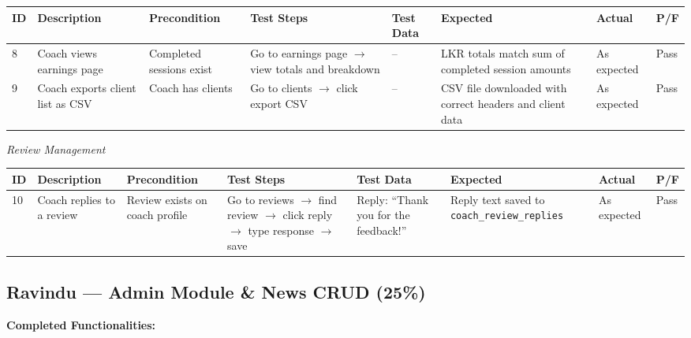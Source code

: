 \documentclass[12pt,a4paper]{report}
\begin{document}
\begin{center}
\footnotesize
\begin{longtable}{p{0.4cm} p{2.2cm} p{1.8cm} p{3.2cm} p{2.2cm} p{2.2cm} p{1.4cm} p{0.8cm}}
\toprule
\textbf{ID} & \textbf{Description} & \textbf{Precondition} & \textbf{Test Steps} & \textbf{Test Data} & \textbf{Expected} & \textbf{Actual} & \textbf{P/F}\\
\midrule
\endhead
8 & Coach views earnings page & Completed sessions exist & Go to earnings page $\to$ view totals and breakdown & -- & LKR totals match sum of completed session amounts & As expected & Pass\\[4pt]
9 & Coach exports client list as CSV & Coach has clients & Go to clients $\to$ click export CSV & -- & CSV file downloaded with correct headers and client data & As expected & Pass\\
\bottomrule
\end{longtable}
\end{center}

\textit{Review Management}

\begin{center}
\footnotesize
\begin{longtable}{p{0.4cm} p{2.2cm} p{1.8cm} p{3.2cm} p{2.2cm} p{2.2cm} p{1.4cm} p{0.8cm}}
\toprule
\textbf{ID} & \textbf{Description} & \textbf{Precondition} & \textbf{Test Steps} & \textbf{Test Data} & \textbf{Expected} & \textbf{Actual} & \textbf{P/F}\\
\midrule
\endhead
10 & Coach replies to a review & Review exists on coach profile & Go to reviews $\to$ find review $\to$ click reply $\to$ type response $\to$ save & Reply: ``Thank you for the feedback!'' & Reply text saved to \texttt{coach\_review\_replies} & As expected & Pass\\
\bottomrule
\end{longtable}
\end{center}

\subsection{Ravindu --- Admin Module \& News CRUD (25\%)}

\textbf{Completed Functionalities:}
\end{document}
